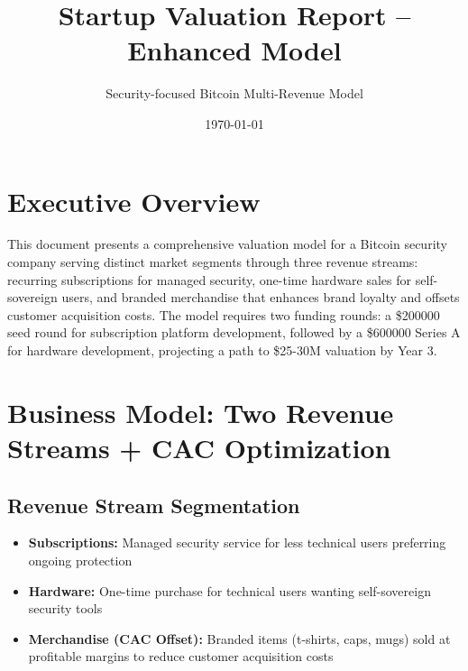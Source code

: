 \documentclass[11pt]{article}
\newcommand{\seedAmount}{200000}
\newcommand{\seriesAAmount}{600000}
\begin{document}
\title{Startup Valuation Report -- Enhanced Model}
\author{Security-focused Bitcoin Multi-Revenue Model}
\date{\today}
\maketitle

\section*{Executive Overview}
This document presents a comprehensive valuation model for a Bitcoin security company serving distinct market segments through three revenue streams: recurring subscriptions for managed security, one-time hardware sales for self-sovereign users, and branded merchandise that enhances brand loyalty and offsets customer acquisition costs. The model requires two funding rounds: a \$\seedAmount{} seed round for subscription platform development, followed by a \$\seriesAAmount{} Series A for hardware development, projecting a path to \$25-30M valuation by Year 3.

\section{Business Model: Two Revenue Streams + CAC Optimization}

\subsection{Revenue Stream Segmentation}
\begin{itemize}
  \item \textbf{Subscriptions:} Managed security service for less technical users preferring ongoing protection
  \item \textbf{Hardware:} One-time purchase for technical users wanting self-sovereign security tools
  \item \textbf{Merchandise (CAC Offset):} Branded items (t-shirts, caps, mugs) sold at profitable margins to reduce customer acquisition costs
\end{itemize}
\end{document}
